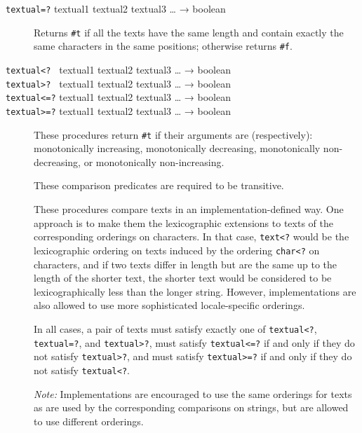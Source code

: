 \begin{description}
\item[ \href{}{} \texttt{textual=?} textual1 textual2 textual3 \ldots{}
→ boolean ]
Returns \texttt{\#t} if all the texts have the same length and contain
exactly the same characters in the same positions; otherwise returns
\texttt{\#f}.
\item[ \href{}{} \href{}{} \href{}{} \href{}{}
\texttt{textual\textless{}?~} textual1 textual2 textual3 \ldots{} →
boolean\\
\texttt{textual\textgreater{}?~} textual1 textual2 textual3 \ldots{} →
boolean\\
\texttt{textual\textless{}=?} textual1 textual2 textual3 \ldots{} →
boolean\\
\texttt{textual\textgreater{}=?} textual1 textual2 textual3 \ldots{} →
boolean ]
These procedures return \texttt{\#t} if their arguments are
(respectively): monotonically increasing, monotonically decreasing,
monotonically non-decreasing, or monotonically non-increasing.

These comparison predicates are required to be transitive.

These procedures compare texts in an implementation-defined way. One
approach is to make them the lexicographic extensions to texts of the
corresponding orderings on characters. In that case,
\texttt{text\textless{}?} would be the lexicographic ordering on texts
induced by the ordering \texttt{char\textless{}?} on characters, and if
two texts differ in length but are the same up to the length of the
shorter text, the shorter text would be considered to be
lexicographically less than the longer string. However, implementations
are also allowed to use more sophisticated locale-specific orderings.

In all cases, a pair of texts must satisfy exactly one of
\texttt{textual\textless{}?}, \texttt{textual=?}, and
\texttt{textual\textgreater{}?}, must satisfy
\texttt{textual\textless{}=?} if and only if they do not satisfy
\texttt{textual\textgreater{}?}, and must satisfy
\texttt{textual\textgreater{}=?} if and only if they do not satisfy
\texttt{textual\textless{}?}.

\emph{Note:} Implementations are encouraged to use the same orderings
for texts as are used by the corresponding comparisons on strings, but
are allowed to use different orderings.


\end{description}
